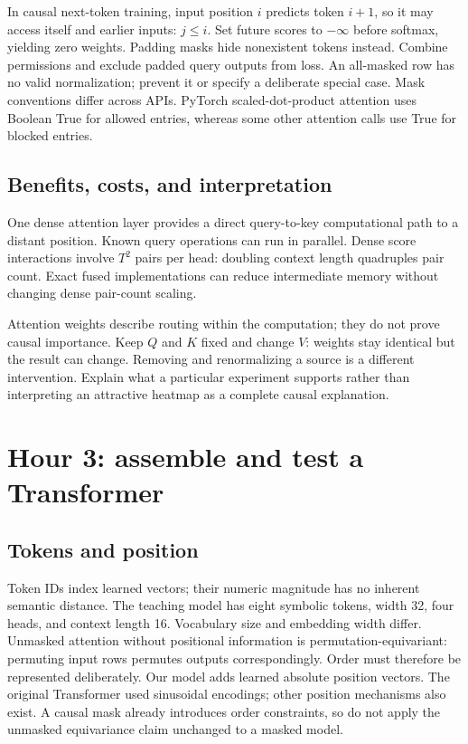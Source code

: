 \documentclass[11pt,oneside]{book}
\begin{document}
In causal next-token training, input position $i$ predicts token $i+1$,
so it may access itself and earlier inputs: $j\le i$. Set future scores
to $-\infty$ before softmax, yielding zero weights. Padding masks hide
nonexistent tokens instead. Combine permissions and exclude padded query
outputs from loss. An all-masked row has no valid normalization; prevent
it or specify a deliberate special case. Mask conventions differ across
APIs. PyTorch scaled-dot-product attention uses Boolean True for allowed
entries, whereas some other attention calls use True for blocked entries.

\subsection{Benefits, costs, and interpretation}
One dense attention layer provides a direct query-to-key computational
path to a distant position. Known query operations can run in parallel.
Dense score interactions involve $T^2$ pairs per head: doubling context
length quadruples pair count. Exact fused implementations can reduce
intermediate memory without changing dense pair-count scaling.

Attention weights describe routing within the computation; they do not
prove causal importance. Keep $Q$ and $K$ fixed and change $V$: weights
stay identical but the result can change. Removing and renormalizing a
source is a different intervention. Explain what a particular experiment
supports rather than interpreting an attractive heatmap as a complete
causal explanation.

\section{Hour 3: assemble and test a Transformer}
\subsection{Tokens and position}
Token IDs index learned vectors; their numeric magnitude has no inherent
semantic distance. The teaching model has eight symbolic tokens, width 32,
four heads, and context length 16. Vocabulary size and embedding width differ.
Unmasked attention without positional information is permutation-equivariant:
permuting input rows permutes outputs correspondingly. Order must therefore
be represented deliberately. Our model adds learned absolute position
vectors. The original Transformer used sinusoidal encodings; other position
mechanisms also exist. A causal mask already introduces order constraints,
so do not apply the unmasked equivariance claim unchanged to a masked model.
\end{document}
